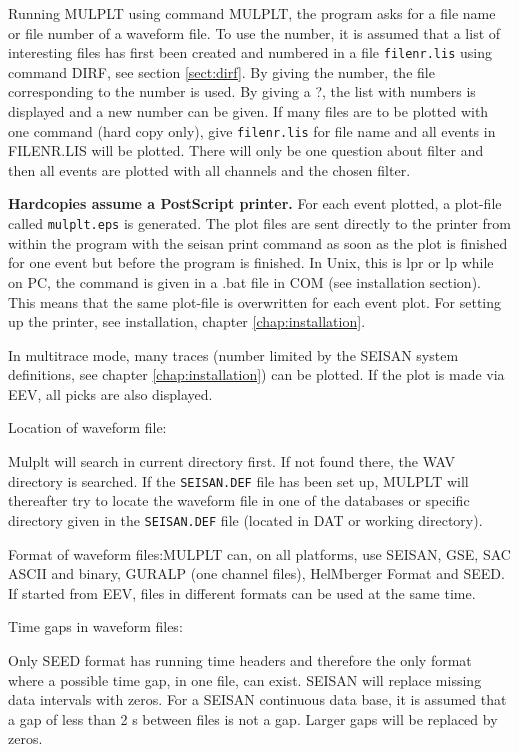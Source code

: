 Running MULPLT using command MULPLT, the program asks for a file name 
or file number of a waveform file. To use the 
number, it is assumed that a list of interesting files has first 
been created and numbered in a file \texttt{filenr.lis} using command 
DIRF, see section \ref{sect:dirf}. By giving the number, the file corresponding 
to the number is used. By giving a ?, the list with numbers is displayed and a new number can be given. If many files are to be plotted with one command (hard copy only), give \texttt{filenr.lis} for file name and all events in FILENR.LIS will be plotted. There will only be one question about filter and then all events are plotted with all channels and the chosen filter. 

\textbf{Hardcopies assume a PostScript printer.} 
For each event plotted, a plot-file called \texttt{mulplt.eps} is generated. The 
plot files are sent directly to the printer from within the program 
with the seisan print command as soon as the plot is finished for 
one event but before the program is finished. In Unix, this is lpr 
or lp while on PC, the command is given in a .bat file in COM (see 
installation section). This means that the same plot-file is overwritten 
for each event plot.  For setting up the printer, see installation, 
chapter \ref{chap:installation}. %

In multitrace mode, many traces (number limited by the SEISAN system 
definitions, see chapter \ref{chap:installation}) %
can be plotted. If the plot is made via EEV, all picks are also displayed. 

Location of waveform file: 

Mulplt will search in current directory first. If not found there, the WAV directory is searched. If the \texttt{SEISAN.DEF} file has been set up, MULPLT will thereafter try to locate the waveform file in one of the databases or specific directory given in the \texttt{SEISAN.DEF} file (located in DAT or working directory).  

Format of waveform files:MULPLT can, on all platforms, use SEISAN, GSE, SAC ASCII and binary, GURALP (one channel files), HelMberger Format and SEED.  If started from EEV, files in different formats can be used at the same time. 

Time gaps in waveform files: 

Only SEED format has running time headers and therefore the only format where a possible time gap, in one file, can exist. SEISAN will replace missing data intervals with zeros. For a SEISAN continuous data base, it is assumed that a gap of less than 2 s between files is not a gap. Larger gaps will be replaced by zeros.


